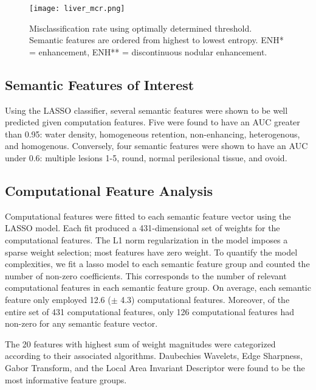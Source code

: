 \begin{figure}
	\centering
	\texttt{[image: liver\_mcr.png]}
	\caption[MCR results for liver annotation]{Misclassification rate using optimally determined threshold. Semantic features are ordered from highest to lowest entropy. ENH* = enhancement, ENH** = discontinuous nodular enhancement.}
	\label{fig:liver_mcr}
\end{figure}


\clearpage


\subsection{Semantic Features of Interest}
Using the LASSO classifier, several semantic features were shown to be well predicted given computation features. Five were found to have an AUC greater than 0.95: water density, homogeneous retention, non-enhancing, heterogenous, and homogenous.
Conversely, four semantic features were shown to have an AUC under 0.6: multiple lesions 1-5, round, normal perilesional tissue, and ovoid.

\subsection{Computational Feature Analysis}
Computational features were fitted to each semantic feature vector using the LASSO model. Each fit produced a 431-dimensional set of weights for the computational features. The L1 norm regularization in the model imposes a sparse weight selection; most features have zero weight. To quantify the model complexities, we fit a lasso model to each semantic feature group and counted the number of non-zero coefficients. This corresponds to the number of relevant computational features in each semantic feature group. On average, each semantic feature only employed 12.6 ($\pm$ 4.3) computational features. Moreover, of the entire set of 431 computational features, only 126 computational features had non-zero for any semantic feature vector.

The 20 features with highest sum of weight magnitudes were categorized according to their associated algorithms. Daubechies Wavelets, Edge Sharpness, Gabor Transform, and the Local Area Invariant Descriptor were found to be the most informative feature groups.
